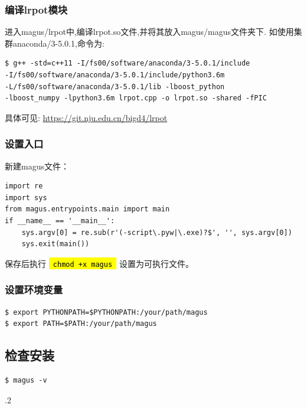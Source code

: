 \documentclass[12pt]{article}
\newcommand{\code}[1]{
  \begingroup
  \sethlcolor{Seashell}
  {\hl{\texttt{~#1~}}}
  \endgroup
}
\begin{document}
\subsubsection{编译lrpot模块}
进入magus/lrpot中,编译lrpot.so文件,并将其放入magus/magus文件夹下.
如使用集群anaconda/3-5.0.1,命令为:
\begin{tcolorbox}
    \begin{verbatim}
$ g++ -std=c++11 -I/fs00/software/anaconda/3-5.0.1/include 
-I/fs00/software/anaconda/3-5.0.1/include/python3.6m 
-L/fs00/software/anaconda/3-5.0.1/lib -lboost_python 
-lboost_numpy -lpython3.6m lrpot.cpp -o lrpot.so -shared -fPIC
\end{verbatim}
\end{tcolorbox}
具体可见:
\textcolor{blue}{\url{https://git.nju.edu.cn/bigd4/lrpot}}
\subsubsection{设置入口}
新建magus文件：
\begin{tcolorbox}
    \begin{verbatim}
import re
import sys
from magus.entrypoints.main import main
if __name__ == '__main__':
    sys.argv[0] = re.sub(r'(-script\.pyw|\.exe)?$', '', sys.argv[0])
    sys.exit(main())
    \end{verbatim}
\end{tcolorbox}
保存后执行\code{chmod +x magus}设置为可执行文件。
\subsubsection{设置环境变量}
\begin{tcolorbox}
    \begin{verbatim}
$ export PYTHONPATH=$PYTHONPATH:/your/path/magus
$ export PATH=$PATH:/your/path/magus
    \end{verbatim}
\end{tcolorbox}
\subsection{检查安装}
\begin{tcolorbox}
    \begin{verbatim}
$ magus -v
    \end{verbatim}
.2
\end{tcolorbox}
\newpage
\end{document}
